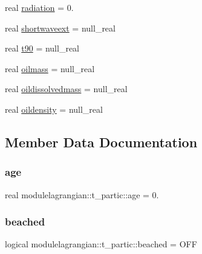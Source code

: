 \begin{DoxyCompactItemize}
\item 
real \mbox{\hyperlink{structmodulelagrangian_1_1t__partic_ad86694e453670101d80c7c3ce60beab1}{radiation}} = 0.
\item 
real \mbox{\hyperlink{structmodulelagrangian_1_1t__partic_a579827f12360e7235eb21ce8864cddc8}{shortwaveext}} = null\+\_\+real
\item 
real \mbox{\hyperlink{structmodulelagrangian_1_1t__partic_a838569ec221fd80036c9ce219c1bc476}{t90}} = null\+\_\+real
\item 
real \mbox{\hyperlink{structmodulelagrangian_1_1t__partic_a6f19bb2030b1c7a62deccf4b244604bc}{oilmass}} = null\+\_\+real
\item 
real \mbox{\hyperlink{structmodulelagrangian_1_1t__partic_a1e10e8f63c9a7d70b968b198dc1116f7}{oildissolvedmass}} = null\+\_\+real
\item 
real \mbox{\hyperlink{structmodulelagrangian_1_1t__partic_ac7f30be6aa71af2f2ffceba51a452d43}{oildensity}} = null\+\_\+real
\end{DoxyCompactItemize}


\subsection{Member Data Documentation}
\mbox{\label{structmodulelagrangian_1_1t__partic_aa89ba754cd22a4b9b4ff112ec5105ccd}} 
\subsubsection{\texorpdfstring{age}{age}}
{\footnotesize\ttfamily real modulelagrangian\+::t\+\_\+partic\+::age = 0.\hspace{0.3cm}{\ttfamily [private]}}

\mbox{\label{structmodulelagrangian_1_1t__partic_a3dc4aef7d4d8b8fb0d0c395841d89ba3}} 
\subsubsection{\texorpdfstring{beached}{beached}}
{\footnotesize\ttfamily logical modulelagrangian\+::t\+\_\+partic\+::beached = O\+FF\hspace{0.3cm}{\ttfamily [private]}}

